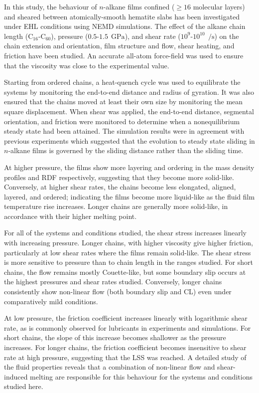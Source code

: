 \documentclass[5p]{elsarticle}
\begin{document}
In this study, the behaviour of $n$-alkane films confined ($\geq 16$ molecular layers) and sheared between atomically-smooth hematite slabs has been investigated under EHL conditions using NEMD simulations. The effect of the alkane chain length (C$_{16}$-C$_{60}$), pressure ($0.5$-$1.5~\SI{}{\giga\pascal}$), and shear rate ($10^{9}$-$10^{10}~\SI{}{\per\second}$) on the chain extension and orientation, film structure and flow, shear heating, and friction have been studied. An accurate all-atom force-field was used to ensure that the viscosity was close to the experimental value.

Starting from ordered chains, a heat-quench cycle was used to equilibrate the systems by monitoring the end-to-end distance and radius of gyration. It was also ensured that the chains moved at least their own size by monitoring the mean square displacement. When shear was applied, the end-to-end distance, segmental orientation, and friction were monitored to determine when a nonequilibrium steady state had been attained. The simulation results were in agreement with previous experiments which suggested that the evolution to steady state sliding in $n$-alkane films is governed by the sliding distance rather than the sliding time.

At higher pressure, the films show more layering and ordering in the mass density profiles and RDF respectively, suggesting that they become more solid-like. Conversely, at higher shear rates, the chains become less elongated, aligned, layered, and ordered; indicating the films become more liquid-like as the fluid film temperature rise increases. Longer chains are generally more solid-like, in accordance with their higher melting point.

For all of the systems and conditions studied, the shear stress increases linearly with increasing pressure. Longer chains, with higher viscosity give higher friction, particularly at low shear rates where the films remain solid-like. The shear stress is more sensitive to pressure than to chain length in the ranges studied. For short chains, the flow remains mostly Couette-like, but some boundary slip occurs at the highest pressures and shear rates studied. Conversely, longer chains consistently show non-linear flow (both boundary slip and CL) even under comparatively mild conditions. 

At low pressure, the friction coefficient increases linearly with logarithmic shear rate, as is commonly observed for lubricants in experiments and simulations. For short chains, the slope of this increase becomes shallower as the pressure increases. For longer chains, the friction coefficient becomes insensitive to shear rate at high pressure, suggesting that the LSS was reached. A detailed study of the fluid properties reveals that a combination of non-linear flow and shear-induced melting are responsible for this behaviour for the systems and conditions studied here.
\end{document}
